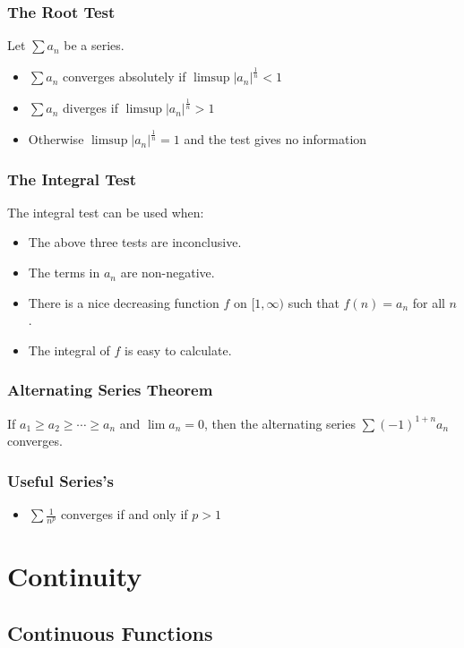 \documentclass{article}
\begin{document}
\subsubsection{The Root Test}
Let $\sum a_n$ be a series.
\begin{itemize}
\item $\sum a_n$ converges absolutely if $\displaystyle\limsup |a_n|^{\frac{1}{n}}<1$
\item $\sum a_n$ diverges if $\displaystyle\limsup |a_n|^{\frac{1}{n}}>1$
\item Otherwise $\displaystyle\limsup |a_n|^{\frac{1}{n}}=1$ and the test gives no information
\end{itemize}

\subsubsection{The Integral Test}
The integral test can be used when:
\begin{itemize}
\item The above three tests are inconclusive. 
\item The terms in $a_n$ are non-negative.
\item There is a nice decreasing function $f$ on $[1,\infty)$ such that $f(n)=a_n$ for all $n$.
\item The integral of $f$ is easy to calculate.
\end{itemize}

\subsubsection{Alternating Series Theorem}

If $a_1\geq a_2\geq\cdots\geq a_n$ and $\lim a_n = 0$, then the alternating series $\sum (-1)^{1+n}a_n$ converges.

\subsubsection{Useful Series's}

\begin{itemize}
\item $\sum \frac{1}{n^p}$ converges if and only if $p>1$
\end{itemize}
\pagebreak
\section{Continuity}

\subsection{Continuous Functions}
\end{document}
